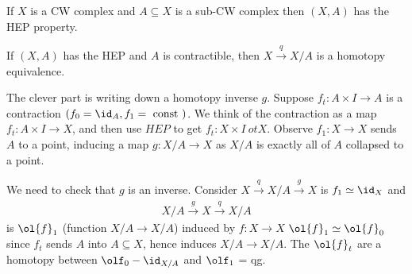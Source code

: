 \begin{thm}\label{thm:cw-pairs-have-HEP}
  If $X$ is a CW complex and $A\subseteq X$ is a sub-CW complex then $(X,A)$ has the HEP property.
\end{thm}
\begin{thm}\label{thm:contractible-yields-quotient-homotopy}
  If $(X,A)$ has the HEP and $A$ is contractible, then $X \xrightarrow{q} X/A$ is a homotopy equivalence.
\end{thm}
\begin{prf}
  The clever part is writing down a homotopy inverse $g$. Suppose $f_t:A\times I \to A$ is a contraction $(f_0 = \id_A, f_1 =\text{ const })$. We think of the contraction as a map $f_t:A\times I \to X$, and then use $HEP$ to get $f_t:X\times I\ ot X$. Observe $f_1: X\to X$ sends $A$ to a point, inducing a map $g:X/A\to X$ as $X/A$ is exactly all of $A$ collapsed to a point.

  We need to check that $g$ is an inverse. Consider $X \xrightarrow{q} X/A \xrightarrow{g} X$ is $f_1 \simeq \id_X$ and
  \begin{align*}
    X/A \xrightarrow{g} X \xrightarrow{q} X/A
  \end{align*}
  is $\ol{f}_1$ (function $X/A \to X/A$) induced by $f:X\to X$ $\ol{f}_1 \simeq \ol{f}_0$ since $f_t$ sends $A$ into $A \subseteq X$, hence induces $X/A \to X/A$. The $\ol{f}_t$ are a homotopy between $\olf_0 - \id_{X/A}$ and $\olf_1$ = q\circ g.
\end{prf}




